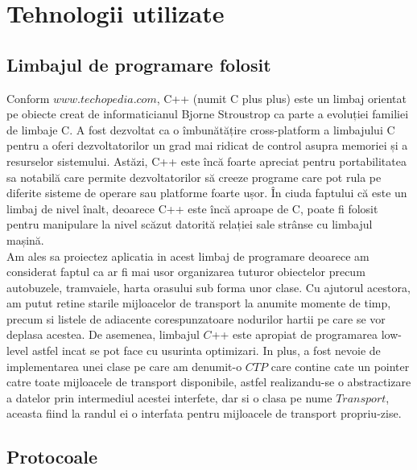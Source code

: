 \documentclass{llncs}
\begin{document}
\section{Tehnologii utilizate}

\subsection{Limbajul de programare folosit}
\hspace{4mm} Conform $www.techopedia.com$, C++ (numit C plus plus) este un limbaj orientat pe obiecte creat de informaticianul Bjorne Stroustrop ca parte a evoluției familiei de limbaje C. A fost dezvoltat ca o îmbunătățire cross-platform a limbajului C pentru a oferi dezvoltatorilor un grad mai ridicat de control asupra memoriei și a resurselor sistemului. Astăzi, C++ este încă foarte apreciat pentru portabilitatea sa notabilă care permite dezvoltatorilor să creeze programe care pot rula pe diferite sisteme de operare sau platforme foarte ușor. În ciuda faptului că este un limbaj de nivel înalt, deoarece C++ este încă aproape de C, poate fi folosit pentru manipulare la nivel scăzut datorită relației sale strânse cu limbajul mașină.\\
\hspace{4mm} Am ales sa proiectez aplicatia in acest limbaj de programare deoarece am considerat faptul ca ar fi mai usor organizarea tuturor obiectelor precum autobuzele, tramvaiele, harta orasului sub forma unor clase. Cu ajutorul acestora, am putut retine starile mijloacelor de transport la anumite momente de timp, precum si listele de adiacente corespunzatoare nodurilor hartii pe care se vor deplasa acestea. De asemenea, limbajul $C$++ este apropiat de programarea low-level astfel incat se pot face cu usurinta optimizari. In plus, a fost nevoie de implementarea unei clase pe care am denumit-o $CTP$ care contine cate un pointer catre toate mijloacele de transport disponibile, astfel realizandu-se o abstractizare a datelor prin intermediul acestei interfete, dar si o clasa pe nume $Transport$, aceasta fiind la randul ei o interfata pentru mijloacele de transport propriu-zise. 


\subsection{Protocoale}
\end{document}
